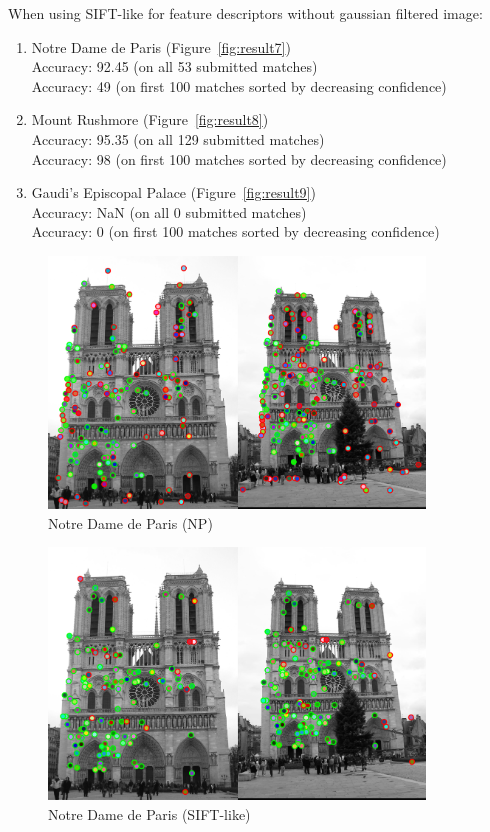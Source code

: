 When using SIFT-like for feature descriptors without gaussian filtered image:
\begin{enumerate}
    \item Notre Dame de Paris (Figure~\ref{fig:result7})\\
    Accuracy:  92.45 (on all 53 submitted matches)\\
    Accuracy:  49 (on first 100 matches sorted by decreasing confidence)
    \item Mount Rushmore (Figure~\ref{fig:result8})\\
    Accuracy:  95.35 (on all 129 submitted matches)\\
    Accuracy:  98 (on first 100 matches sorted by decreasing confidence)
    \item Gaudi's Episcopal Palace (Figure~\ref{fig:result9})\\
    Accuracy:  NaN (on all 0 submitted matches)\\
    Accuracy:  0 (on first 100 matches sorted by decreasing confidence)
\end{enumerate}


\begin{figure}[h]
    \centering
    \includegraphics[width=10cm]{writeup/eval_ND bad.png}
    \caption{Notre Dame de Paris (NP)}
    \label{fig:result1}
\end{figure}

\begin{figure}[h]
    \centering
    \includegraphics[width=10cm]{writeup/eval_ND.png}
    \caption{Notre Dame de Paris (SIFT-like)}
    \label{fig:result4}
\end{figure}

